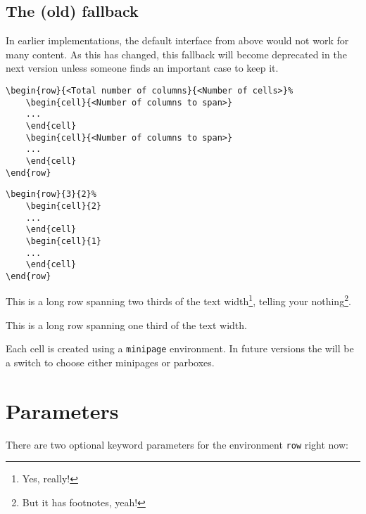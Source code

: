 \documentclass[DIV13]{scrartcl}
\begin{document}
\clearpage

\subsection{The (old) fallback}
In earlier implementations, the default interface from above would not work for many content. As this has changed, this fallback will become deprecated in the next version unless someone finds an important case to keep it.

\begin{lstlisting}
\begin{row}{<Total number of columns}{<Number of cells>}%
	\begin{cell}{<Number of columns to span>}
	...
	\end{cell}
	\begin{cell}{<Number of columns to span>}
	...
	\end{cell}
\end{row}
\end{lstlisting}

\begin{lstlisting}
\begin{row}{3}{2}%
	\begin{cell}{2}
	...
	\end{cell}
	\begin{cell}{1}
	...
	\end{cell}
\end{row}
\end{lstlisting}

\begin{row}{3}{2}%
	\begin{cell}{2}
	This is a long row spanning two thirds of the text width\footnote{Yes, really!}, telling your nothing\footnote{But it has footnotes, yeah!}.
	\end{cell}
	\begin{cell}{1}
	This is a long row spanning one third of the text width.
	\end{cell}
\end{row}

\bigskip

Each cell is created using a \texttt{minipage} environment. In future versions the will be a switch to choose either minipages or parboxes.

\section{Parameters}
There are two optional keyword parameters for the environment \texttt{row} right now:
\end{document}
